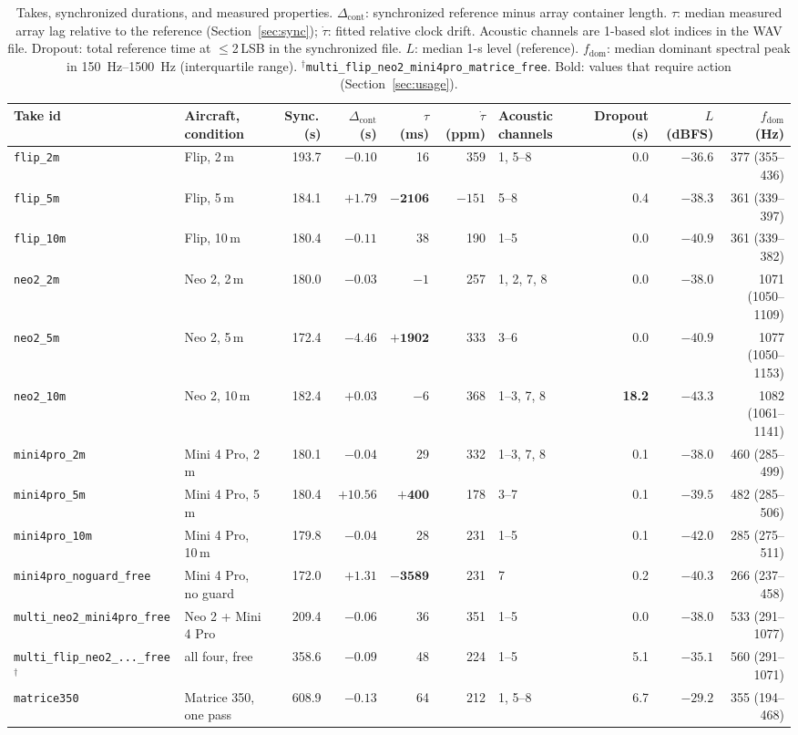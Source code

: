 \documentclass[journal]{IEEEtran}
\begin{document}
\begin{table}[t]
\caption{Takes, synchronized durations, and measured properties. $\Delta_\text{cont}$: synchronized reference minus array container length. $\tau$: median measured array lag relative to the reference (Section~\ref{sec:sync}); $\dot\tau$: fitted relative clock drift. Acoustic channels are 1-based slot indices in the WAV file. Dropout: total reference time at $\le$2\,LSB in the synchronized file. $L$: median 1-s level (reference). $f_\text{dom}$: median dominant spectral peak in \SIrange{150}{1500}{\hertz} (interquartile range). $^\dagger$\texttt{multi\_flip\_neo2\_mini4pro\_matrice\_free}. Bold: values that require action (Section~\ref{sec:usage}).}
\label{tab:takes}
\centering\scriptsize
\setlength{\tabcolsep}{3pt}
\begin{tabular}{@{}llrrrrlrrr@{}}
\toprule
Take id & Aircraft, condition & Sync.\,(s) & $\Delta_\text{cont}$ (s) & $\tau$ (ms) & $\dot\tau$ (ppm) & Acoustic channels & Dropout (s) & $L$ (dBFS) & $f_\text{dom}$ (Hz) \\
\midrule
\texttt{flip\_2m} & Flip, 2\,m & 193.7 & $-0.10$ & 16 & 359 & 1, 5--8 & 0.0 & $-36.6$ & 377 (355--436) \\
\texttt{flip\_5m} & Flip, 5\,m & 184.1 & $+1.79$ & $\mathbf{-2106}$ & $-151$ & 5--8 & 0.4 & $-38.3$ & 361 (339--397) \\
\texttt{flip\_10m} & Flip, 10\,m & 180.4 & $-0.11$ & 38 & 190 & 1--5 & 0.0 & $-40.9$ & 361 (339--382) \\
\texttt{neo2\_2m} & Neo 2, 2\,m & 180.0 & $-0.03$ & $-1$ & 257 & 1, 2, 7, 8 & 0.0 & $-38.0$ & 1071 (1050--1109) \\
\texttt{neo2\_5m} & Neo 2, 5\,m & 172.4 & $-4.46$ & $\mathbf{+1902}$ & 333 & 3--6 & 0.0 & $-40.9$ & 1077 (1050--1153) \\
\texttt{neo2\_10m} & Neo 2, 10\,m & 182.4 & $+0.03$ & $-6$ & 368 & 1--3, 7, 8 & \textbf{18.2} & $-43.3$ & 1082 (1061--1141) \\
\texttt{mini4pro\_2m} & Mini 4 Pro, 2\,m & 180.1 & $-0.04$ & 29 & 332 & 1--3, 7, 8 & 0.1 & $-38.0$ & 460 (285--499) \\
\texttt{mini4pro\_5m} & Mini 4 Pro, 5\,m & 180.4 & $+10.56$ & $\mathbf{+400}$ & 178 & 3--7 & 0.1 & $-39.5$ & 482 (285--506) \\
\texttt{mini4pro\_10m} & Mini 4 Pro, 10\,m & 179.8 & $-0.04$ & 28 & 231 & 1--5 & 0.1 & $-42.0$ & 285 (275--511) \\
\texttt{mini4pro\_noguard\_free} & Mini 4 Pro, no guard & 172.0 & $+1.31$ & $\mathbf{-3589}$ & 231 & 7 & 0.2 & $-40.3$ & 266 (237--458) \\
\texttt{multi\_neo2\_mini4pro\_free} & Neo 2 + Mini 4 Pro & 209.4 & $-0.06$ & 36 & 351 & 1--5 & 0.0 & $-38.0$ & 533 (291--1077) \\
\texttt{multi\_flip\_neo2\_...\_free}$^\dagger$ & all four, free & 358.6 & $-0.09$ & 48 & 224 & 1--5 & 5.1 & $-35.1$ & 560 (291--1071) \\
\texttt{matrice350} & Matrice 350, one pass & 608.9 & $-0.13$ & 64 & 212 & 1, 5--8 & 6.7 & $-29.2$ & 355 (194--468) \\
\bottomrule
\end{tabular}
\end{table}
\end{document}
